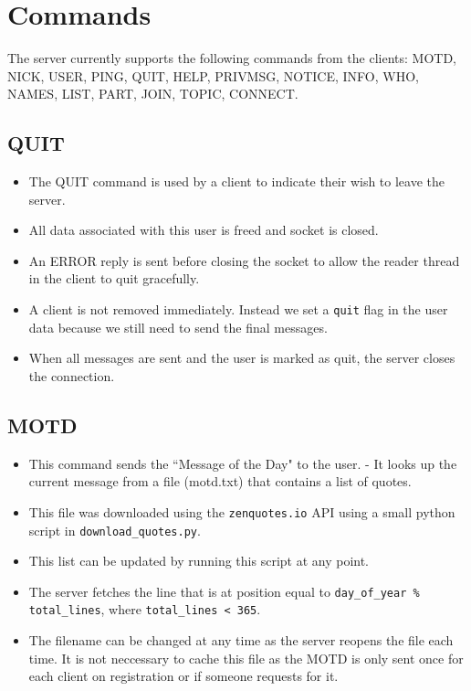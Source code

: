 \documentclass[letterpaper,twocolumn,10pt]{article}
\begin{document}
\section{Commands}

The server currently supports the following commands from the clients: MOTD,
NICK, USER, PING, QUIT, HELP, PRIVMSG, NOTICE, INFO, WHO, NAMES, LIST, PART,
JOIN, TOPIC, CONNECT. 

\subsection{QUIT}

\begin{itemize}

	\item The QUIT command is used by a client to indicate their wish to leave
	      the server.
	\item All data associated with this user is freed and socket is closed.
	\item An ERROR reply is sent before closing the socket to allow the reader
	      thread in the client to quit gracefully.
	\item A client is not removed immediately. Instead we set a \verb|quit|
	      flag in the user data because we still need to send the final messages.

	\item When all messages are sent and the user is marked as quit, the server
	      closes the connection.

\end{itemize}

\subsection{MOTD}

\begin{itemize}

	\item This command sends the ``Message of the Day" to the user. - It looks
	      up the current message from a file (motd.txt) that contains a list of
	      quotes.
	\item This file was downloaded using the \verb|zenquotes.io| API using a
	      small python script in \verb|download_quotes.py|.
	\item This list can be updated by running this script at any point.
	\item The server fetches the line that is at position equal to
	      \verb|day_of_year % total_lines|, where \verb|total_lines < 365|.
	\item The filename can be changed at any time as the server reopens the
	      file each time. It is not neccessary to cache this file as the MOTD is
	      only sent once for each client on registration or if someone requests
	      for it.

\end{itemize}
\end{document}
